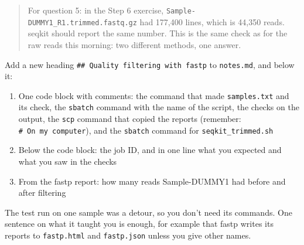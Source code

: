 \documentclass[
  letterpaper,
  DIV=11,
  numbers=noendperiod]{scrreprt}
\newenvironment{Shaded}{}{}
\newcommand{\AttributeTok}[1]{\textcolor[rgb]{0.84,0.23,0.29}{#1}}
\newcommand{\CommentTok}[1]{\textcolor[rgb]{0.42,0.45,0.49}{#1}}
\newcommand{\ExtensionTok}[1]{\textcolor[rgb]{0.84,0.23,0.29}{\textbf{#1}}}
\newcommand{\FunctionTok}[1]{\textcolor[rgb]{0.44,0.26,0.76}{#1}}
\newcommand{\NormalTok}[1]{\textcolor[rgb]{0.14,0.16,0.18}{#1}}
\newcommand{\PreprocessorTok}[1]{\textcolor[rgb]{0.84,0.23,0.29}{#1}}
\newcommand{\StringTok}[1]{\textcolor[rgb]{0.01,0.18,0.38}{#1}}
\newcommand{\VariableTok}[1]{\textcolor[rgb]{0.89,0.38,0.04}{#1}}
\providecommand{\tightlist}{%
  \setlength{\itemsep}{0pt}\setlength{\parskip}{0pt}}
\begin{document}
\begin{tcolorbox}
\begin{quote}
\begin{Shaded}
\end{Shaded}

For question 5: in the Step 6 exercise,
\texttt{Sample-DUMMY1\_R1.trimmed.fastq.gz} had 177,400 lines, which is
44,350 reads. seqkit should report the same number. This is the same
check as for the raw reads this morning: two different methods, one
answer.
\end{quote}

\end{tcolorbox}

\begin{tcolorbox}[enhanced jigsaw, colbacktitle=quarto-callout-color!10!white, rightrule=.15mm, leftrule=.75mm, colback=white, opacitybacktitle=0.6, title=\textcolor{quarto-callout-color}{\faInfo}\hspace{0.5em}{Notebook checkpoint: Quality filtering with fastp}, bottomrule=.15mm, left=2mm, colframe=quarto-callout-color-frame, opacityback=0, breakable, bottomtitle=1mm, coltitle=black, arc=.35mm, toprule=.15mm, toptitle=1mm, titlerule=0mm]

Add a new heading \texttt{\#\#\ Quality\ filtering\ with\ fastp} to
\texttt{notes.md}, and below it:

\begin{enumerate}
\def\labelenumi{\arabic{enumi}.}
\tightlist
\item
  One code block with comments: the command that made
  \texttt{samples.txt} and its check, the \texttt{sbatch} command with
  the name of the script, the checks on the output, the \texttt{scp}
  command that copied the reports (remember:
  \texttt{\#\ On\ my\ computer}), and the \texttt{sbatch} command for
  \texttt{seqkit\_trimmed.sh}
\item
  Below the code block: the job ID, and in one line what you expected
  and what you saw in the checks
\item
  From the fastp report: how many reads Sample-DUMMY1 had before and
  after filtering
\end{enumerate}

The test run on one sample was a detour, so you don't need its commands.
One sentence on what it taught you is enough, for example that fastp
writes its reports to \texttt{fastp.html} and \texttt{fastp.json} unless
you give other names.

\end{tcolorbox}
\end{document}

